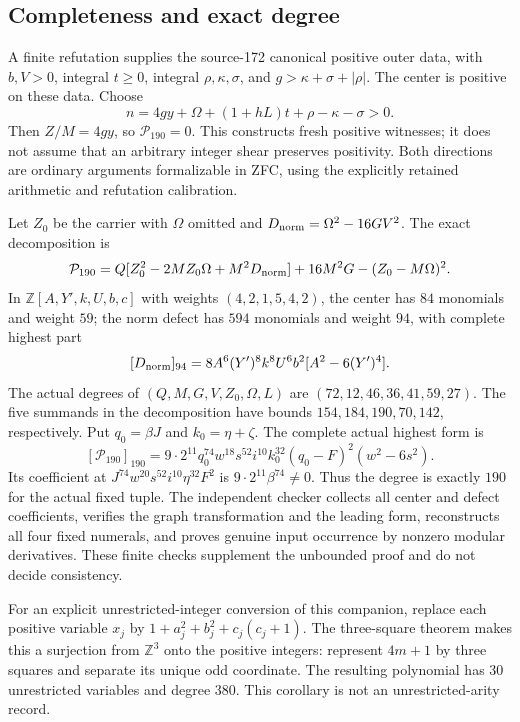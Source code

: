 \subsection{Completeness and exact degree}

A finite refutation supplies the source-172 canonical positive outer data,
with $b,V>0$, integral $t\ge0$, integral $\rho,\kappa,\sigma$, and
$g>\kappa+\sigma+|\rho|$.  The center is positive on these data.
Choose
\[
 n=4gy+\Omega+(1+hL)t+\rho-\kappa-\sigma>0.
\]
Then $Z/M=4gy$, so $\mathcal P_{190}=0$.  This constructs fresh positive
witnesses; it does not assume that an arbitrary integer shear preserves
positivity.  Both directions are ordinary arguments formalizable in ZFC,
using the explicitly retained arithmetic and refutation calibration.

Let $Z_0$ be the carrier with $\Omega$ omitted and
$D_{\rm norm}=\Omega^2-16GV^2$.  The exact decomposition is
\[
 \mathcal P_{190}
 =Q[Z_0^2-2MZ_0\Omega+M^2D_{\rm norm}]
   +16M^2G-(Z_0-M\Omega)^2.
\]
In $\mathbb Z[A,Y',k,U,b,c]$ with weights $(4,2,1,5,4,2)$, the center
has $84$ monomials and weight $59$; the norm defect has $594$ monomials
and weight $94$, with complete highest part
\[
 [D_{\rm norm}]_{94}
 =8A^6(Y')^8k^8U^6b^2[A^2-6(Y')^4].
\]
The actual degrees of $(Q,M,G,V,Z_0,\Omega,L)$ are
$(72,12,46,36,41,59,27)$.  The five summands in the decomposition have
bounds $154,184,190,70,142$, respectively.  Put $q_0=\beta J$ and
$k_0=\eta+\zeta$.  The complete actual highest form is
\[
 [\mathcal P_{190}]_{190}
 =9\cdot2^{11}q_0^{74}w^{18}s^{52}i^{10}k_0^{32}
   (q_0-F)^2(w^2-6s^2).
\]
Its coefficient at $J^{74}w^{20}s^{52}i^{10}\eta^{32}F^2$ is
$9\cdot2^{11}\beta^{74}\ne0$.  Thus the degree is exactly $190$ for
the actual fixed tuple.  The independent checker collects all center and
defect coefficients, verifies the graph transformation and the leading
form, reconstructs all four fixed numerals, and proves genuine input
occurrence by nonzero modular derivatives.  These finite checks supplement
the unbounded proof and do not decide consistency.

For an explicit unrestricted-integer conversion of this companion, replace
each positive variable $x_j$ by $1+a_j^2+b_j^2+c_j(c_j+1)$.  The
three-square theorem makes this a surjection from $\mathbb Z^3$ onto the
positive integers: represent $4m+1$ by three squares and separate its
unique odd coordinate.  The resulting polynomial has $30$ unrestricted
variables and degree $380$.  This corollary is not an unrestricted-arity
record.
